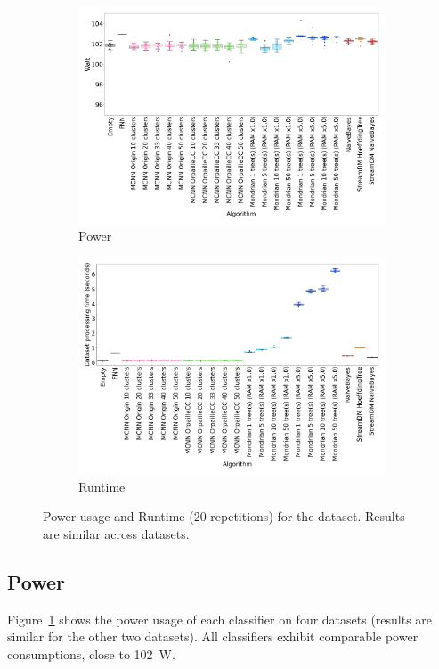 \begin{figure}
	\centering
	\begin{subfigure}[t]{.49\linewidth}
		\includegraphics[width=\linewidth]{figures/results/banos_6_watt.png}
		\caption{Power}
		\label{fig:power}
	\end{subfigure}
	\begin{subfigure}[t]{.49\linewidth}
	\includegraphics[width=\linewidth]{figures/results/banos_6_runtime.png}
	\caption{Runtime}
	\label{fig:runtime}
	\end{subfigure}
		\caption{Power usage and Runtime (20 repetitions) for the \banosdataset dataset. Results are similar across datasets.}
\end{figure}
\subsection{Power}
\label{sec:result-power}
Figure~\ref{fig:power} shows the power usage of each classifier on four
datasets (results are similar for the other two datasets). All classifiers exhibit comparable power consumptions, close to
102~W. 

